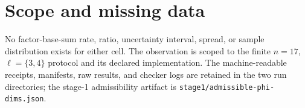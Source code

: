 \documentclass[10pt]{article}
\newcommand{\code}[1]{\texttt{\small #1}}
\begin{document}
\section*{Scope and missing data}
No factor-base-sum rate, ratio, uncertainty interval, spread, or sample distribution exists for either cell. The observation is scoped to the finite $n=17$, $\ell=\{3,4\}$ protocol and its declared implementation. The machine-readable receipts, manifests, raw results, and checker logs are retained in the two run directories; the stage-1 admissibility artifact is \code{stage1/admissible-phi-dims.json}.
\end{document}
